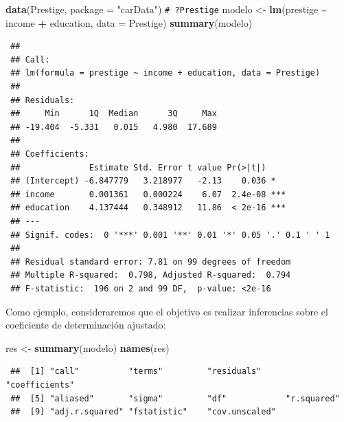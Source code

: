 \documentclass[
  spanish,
  10pt,
]{book}
\newenvironment{Shaded}{\begin{snugshade}}{\end{snugshade}}
\newcommand{\AttributeTok}[1]{\textcolor[rgb]{0.13,0.29,0.53}{#1}}
\newcommand{\CommentTok}[1]{\textcolor[rgb]{0.56,0.35,0.01}{\textit{#1}}}
\newcommand{\FunctionTok}[1]{\textcolor[rgb]{0.13,0.29,0.53}{\textbf{#1}}}
\newcommand{\NormalTok}[1]{#1}
\newcommand{\OtherTok}[1]{\textcolor[rgb]{0.56,0.35,0.01}{#1}}
\newcommand{\SpecialCharTok}[1]{\textcolor[rgb]{0.81,0.36,0.00}{\textbf{#1}}}
\newcommand{\StringTok}[1]{\textcolor[rgb]{0.31,0.60,0.02}{#1}}
\theoremstyle{break}
\theoremstyle{nonumberplain}
\renewcommand{\CommentTok}[1]{\textcolor[rgb]{0.41,0.41,0.41}{\texttt{#1}}}
\begin{document}
\begin{Shaded}
\begin{Highlighting}[]
\FunctionTok{data}\NormalTok{(Prestige, }\AttributeTok{package =} \StringTok{"carData"}\NormalTok{)}
\CommentTok{\# ?Prestige}
\NormalTok{modelo }\OtherTok{\textless{}{-}} \FunctionTok{lm}\NormalTok{(prestige }\SpecialCharTok{\textasciitilde{}}\NormalTok{ income }\SpecialCharTok{+}\NormalTok{ education, }\AttributeTok{data =}\NormalTok{ Prestige)}
\FunctionTok{summary}\NormalTok{(modelo)}
\end{Highlighting}
\end{Shaded}

\begin{verbatim}
 ## 
 ## Call:
 ## lm(formula = prestige ~ income + education, data = Prestige)
 ## 
 ## Residuals:
 ##     Min      1Q  Median      3Q     Max 
 ## -19.404  -5.331   0.015   4.980  17.689 
 ## 
 ## Coefficients:
 ##              Estimate Std. Error t value Pr(>|t|)    
 ## (Intercept) -6.847779   3.218977   -2.13    0.036 *  
 ## income       0.001361   0.000224    6.07  2.4e-08 ***
 ## education    4.137444   0.348912   11.86  < 2e-16 ***
 ## ---
 ## Signif. codes:  0 '***' 0.001 '**' 0.01 '*' 0.05 '.' 0.1 ' ' 1
 ## 
 ## Residual standard error: 7.81 on 99 degrees of freedom
 ## Multiple R-squared:  0.798, Adjusted R-squared:  0.794 
 ## F-statistic:  196 on 2 and 99 DF,  p-value: <2e-16
\end{verbatim}

Como ejemplo, consideraremos que el objetivo es realizar inferencias sobre el coeficiente de determinación ajustado:

\begin{Shaded}
\begin{Highlighting}[]
\NormalTok{res }\OtherTok{\textless{}{-}} \FunctionTok{summary}\NormalTok{(modelo)}
\FunctionTok{names}\NormalTok{(res)}
\end{Highlighting}
\end{Shaded}

\begin{verbatim}
 ##  [1] "call"          "terms"         "residuals"     "coefficients" 
 ##  [5] "aliased"       "sigma"         "df"            "r.squared"    
 ##  [9] "adj.r.squared" "fstatistic"    "cov.unscaled"
\end{verbatim}

\begin{Shaded}
\end{Shaded}
\end{document}
